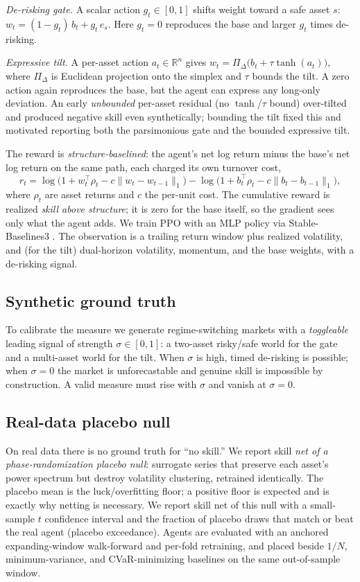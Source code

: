 \documentclass[sigconf,anonymous,review]{acmart}
\begin{document}
\emph{De-risking gate.} A scalar action $g_t \in [0,1]$ shifts weight toward a safe
asset $s$: $w_t = (1-g_t)\,b_t + g_t\,e_s$. Here $g_t=0$ reproduces the base and
larger $g_t$ times de-risking.

\emph{Expressive tilt.} A per-asset action $a_t \in \mathbb{R}^n$ gives
$w_t = \Pi_{\Delta}\big(b_t + \tau\tanh(a_t)\big)$, where $\Pi_\Delta$ is Euclidean
projection onto the simplex \cite{duchi2008} and $\tau$ bounds the tilt. A zero
action again reproduces the base, but the agent can express any long-only deviation.
An early \emph{unbounded} per-asset residual (no $\tanh$/$\tau$ bound) over-tilted
and produced negative skill even synthetically; bounding the tilt fixed this and
motivated reporting both the parsimonious gate and the bounded expressive tilt.

The reward is \emph{structure-baselined}: the agent's net log return minus the
base's net log return on the same path, each charged its own turnover cost,
\begin{equation}
r_t = \log\!\big(1 + w_t^\top \rho_t - c\|w_t - w_{t-1}\|_1\big)
    - \log\!\big(1 + b_t^\top \rho_t - c\|b_t - b_{t-1}\|_1\big),
\end{equation}
where $\rho_t$ are asset returns and $c$ the per-unit cost. The cumulative reward is
realized \emph{skill above structure}; it is zero for the base itself, so the
gradient sees only what the agent adds. We train PPO \cite{schulman2017} with an MLP
policy via Stable-Baselines3 \cite{raffin2021}. The observation is a trailing return
window plus realized volatility, and (for the tilt) dual-horizon volatility,
momentum, and the base weights, with a de-risking signal.

\subsection{Synthetic ground truth}
To calibrate the measure we generate regime-switching markets with a \emph{toggleable}
leading signal of strength $\sigma\in[0,1]$: a two-asset risky/safe world for the
gate and a multi-asset world for the tilt. When $\sigma$ is high, timed de-risking is
possible; when $\sigma=0$ the market is unforecastable and genuine skill is
impossible by construction. A valid measure must rise with $\sigma$ and vanish at
$\sigma=0$.

\subsection{Real-data placebo null}
On real data there is no ground truth for ``no skill.'' We report skill \emph{net of
a phase-randomization placebo null}: surrogate series that preserve each asset's
power spectrum but destroy volatility clustering, retrained identically. The placebo
mean is the luck/overfitting floor; a positive floor is expected and is exactly why
netting is necessary. We report skill net of this null with a small-sample $t$
confidence interval and the fraction of placebo draws that match or beat the real
agent (placebo exceedance). Agents are evaluated with an anchored expanding-window
walk-forward and per-fold retraining, and placed beside $1/N$, minimum-variance, and
CVaR-minimizing baselines on the same out-of-sample window.
\end{document}
